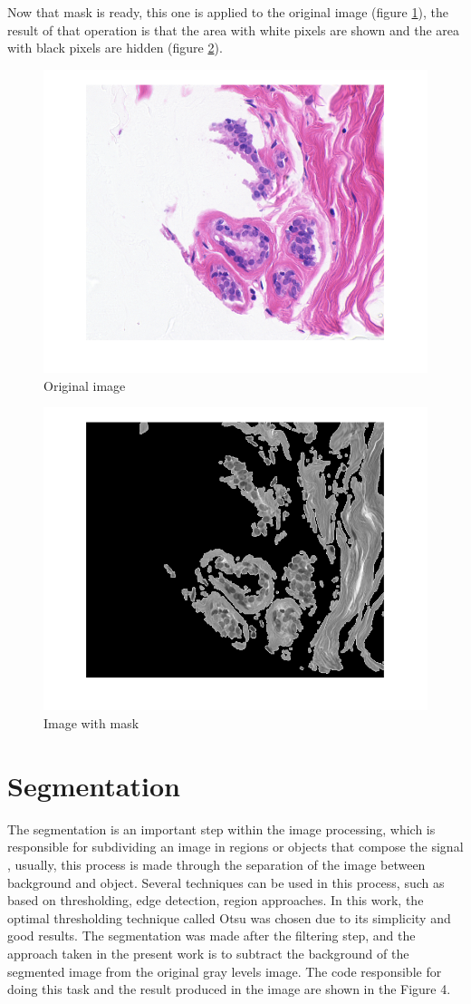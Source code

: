 \documentclass[conference]{IEEEtran}
\begin{document}
	\par Now that mask is ready, this one is applied to the original image (figure \ref{fig:original}), the result of that operation is that the area with white pixels are shown and the area with black pixels are hidden (figure \ref{fig:maskedimage}).

	\begin{figure}[h]
		\centering
		\includegraphics[width=0.7\linewidth]{images/fourrierFiltering/original}
		\caption{Original image}
		\label{fig:original}
	\end{figure}

	\begin{figure}[h]
		\centering
		\includegraphics[width=0.7\linewidth]{images/fourrierFiltering/maskedImage}
		\caption{Image with mask}
		\label{fig:maskedimage}
	\end{figure}
\section{Segmentation}
\par The segmentation is an important step within the image processing, which is responsible for subdividing  an image in regions or objects that compose the signal \cite{Gonzalez:2006:DIP:1076432}, usually, this process is made through the separation of the image between background and object. Several techniques can be used in this process, such as based on thresholding, edge detection, region approaches. In this work, the optimal thresholding technique called Otsu was chosen due to its simplicity and good results. The segmentation was made after the filtering step, and the approach taken in the present work is to subtract the background of the segmented image from the original gray levels image. The code responsible for doing this task and the result produced in the image are shown in the Figure 4.
\end{document}
